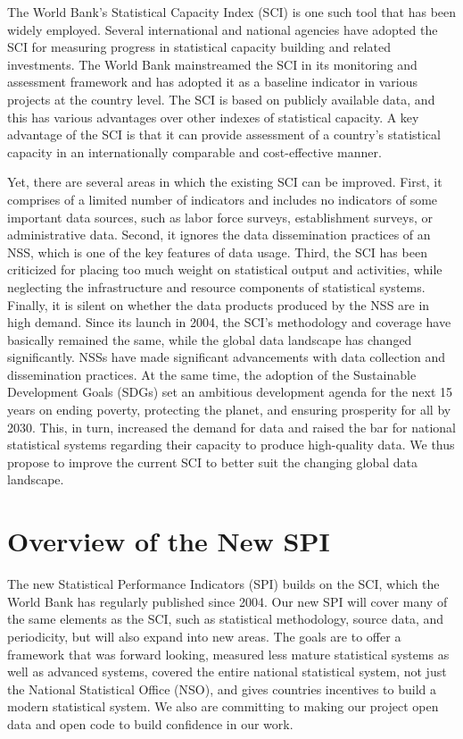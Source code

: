 \documentclass[
]{article}
\begin{document}
The World Bank's Statistical Capacity Index (SCI) is one such tool that has been widely employed. Several international and national agencies have adopted the SCI for measuring progress in statistical capacity building and related investments. The World Bank mainstreamed the SCI in its monitoring and assessment framework and has adopted it as a baseline indicator in various projects at the country level. The SCI is based on publicly available data, and this has various advantages over other indexes of statistical capacity. A key advantage of the SCI is that it can provide assessment of a country's statistical capacity in an internationally comparable and cost-effective manner.

Yet, there are several areas in which the existing SCI can be improved. First, it comprises of a limited number of indicators and includes no indicators of some important data sources, such as labor force surveys, establishment surveys, or administrative data. Second, it ignores the data dissemination practices of an NSS, which is one of the key features of data usage. Third, the SCI has been criticized for placing too much weight on statistical output and activities, while neglecting the infrastructure and resource components of statistical systems. Finally, it is silent on whether the data products produced by the NSS are in high demand.
Since its launch in 2004, the SCI's methodology and coverage have basically remained the same, while the global data landscape has changed significantly. NSSs have made significant advancements with data collection and dissemination practices. At the same time, the adoption of the Sustainable Development Goals (SDGs) set an ambitious development agenda for the next 15 years on ending poverty, protecting the planet, and ensuring prosperity for all by 2030. This, in turn, increased the demand for data and raised the bar for national statistical systems regarding their capacity to produce high-quality data. We thus propose to improve the current SCI to better suit the changing global data landscape.

\hypertarget{overview-of-the-new-spi}{%
\section{Overview of the New SPI}\label{overview-of-the-new-spi}}

The new Statistical Performance Indicators (SPI) builds on the SCI, which the World Bank has regularly published since 2004. Our new SPI will cover many of the same elements as the SCI, such as statistical methodology, source data, and periodicity, but will also expand into new areas. The goals are to offer a framework that was forward looking, measured less mature statistical systems as well as advanced systems, covered the entire national statistical system, not just the National Statistical Office (NSO), and gives countries incentives to build a modern statistical system. We also are committing to making our project open data and open code to build confidence in our work.
\end{document}
